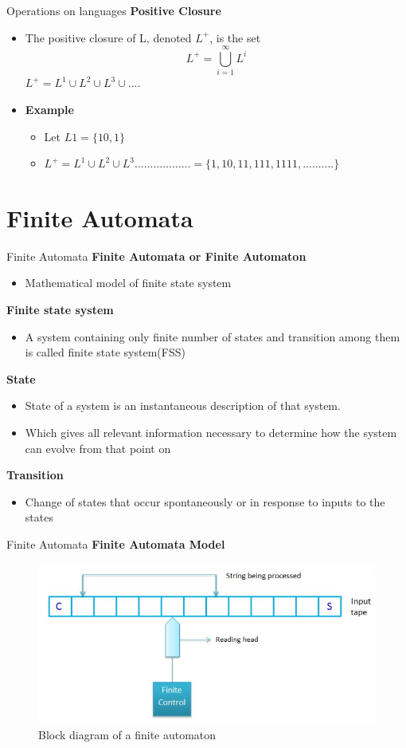 \documentclass{beamer}
\begin{document}
\begin{frame}{Operations on languages}
	\textbf{Positive Closure}
	\begin{itemize}
		\item The positive closure of L, denoted $L^+$, is the set
		$$L^+=\bigcup\limits_{i=1}^{\infty} L^i$$
		$L^+=L^1\cup L^2 \cup L^3 \cup ....$
		\item \textbf{Example}
		\begin{itemize}
			\item Let $L1 = \{10,1\}$ 
			\item $L^+ = L^1 \cup L^2 \cup L^3.................. = \{ 1, 10, 11, 111, 1111 ,..........\}$
		\end{itemize}
	\end{itemize}
\end{frame}
\section{Finite Automata}
\begin{frame}{Finite Automata}
	\textbf{Finite Automata or Finite Automaton}
	\begin{itemize}
		\item Mathematical model of finite state system
	\end{itemize}
\textbf{Finite state system}
\begin{itemize}
	\item A system containing only finite number of states and transition among them is called finite state system(FSS)
\end{itemize}
\textbf{State}
\begin{itemize}
	\item State of a system is an instantaneous description of that system.
	\item Which gives all relevant information necessary to determine how the system can evolve from that point on 
\end{itemize}
\textbf{Transition}
\begin{itemize}
	\item Change of states that occur spontaneously or in response to inputs to the states
\end{itemize}
\end{frame}
\begin{frame}{Finite Automata}
	\textbf{Finite Automata Model}
	\begin{figure}
		\includegraphics[scale=.7]{img1/m1}
		\caption{Block diagram of a finite automaton}
	\end{figure}
\end{frame}
\end{document}
